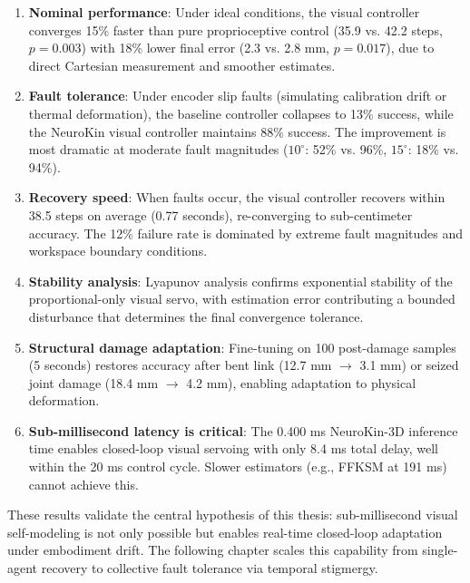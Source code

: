 ﻿\documentclass[12pt,a4paper,oneside]{report}
\begin{document}
\begin{enumerate}
    \item \textbf{Nominal performance}: Under ideal conditions, the visual controller converges 15\% faster than pure proprioceptive control (35.9 vs. 42.2 steps, $p = 0.003$) with 18\% lower final error (2.3 vs. 2.8 mm, $p = 0.017$), due to direct Cartesian measurement and smoother estimates.
    \item \textbf{Fault tolerance}: Under encoder slip faults (simulating calibration drift or thermal deformation), the baseline controller collapses to 13\% success, while the NeuroKin visual controller maintains 88\% success. The improvement is most dramatic at moderate fault magnitudes ($10^\circ$: 52\% vs. 96\%, $15^\circ$: 18\% vs. 94\%).
    \item \textbf{Recovery speed}: When faults occur, the visual controller recovers within 38.5 steps on average (0.77 seconds), re-converging to sub-centimeter accuracy. The 12\% failure rate is dominated by extreme fault magnitudes and workspace boundary conditions.
    \item \textbf{Stability analysis}: Lyapunov analysis confirms exponential stability of the proportional-only visual servo, with estimation error contributing a bounded disturbance that determines the final convergence tolerance.
    \item \textbf{Structural damage adaptation}: Fine-tuning on 100 post-damage samples (5 seconds) restores accuracy after bent link (12.7 mm $\rightarrow$ 3.1 mm) or seized joint damage (18.4 mm $\rightarrow$ 4.2 mm), enabling adaptation to physical deformation.
    \item \textbf{Sub-millisecond latency is critical}: The 0.400 ms NeuroKin-3D inference time enables closed-loop visual servoing with only 8.4 ms total delay, well within the 20 ms control cycle. Slower estimators (e.g., FFKSM at 191 ms) cannot achieve this.
\end{enumerate}

These results validate the central hypothesis of this thesis: sub-millisecond visual self-modeling is not only possible but enables real-time closed-loop adaptation under embodiment drift. The following chapter scales this capability from single-agent recovery to collective fault tolerance via temporal stigmergy.









\end{document}

